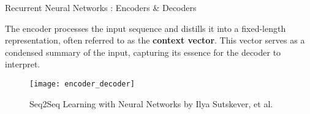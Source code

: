 \documentclass[10pt]{beamer}
\begin{document}
%
%
%

\begin{frame}[fragile]{Recurrent Neural Networks : Encoders \& Decoders}

	The encoder processes the input sequence and distills it into a fixed-length representation, often referred to
	as the \textbf{context vector}. This vector serves as a condensed summary of the input, capturing its essence
	for the decoder to interpret.


	\begin{figure}[h]
		\centering
		\texttt{[image: encoder\_decoder]}
		\caption{Seq2Seq Learning with Neural Networks by Ilya Sutskever, et al.}
	\end{figure}

\end{frame}
\end{document}
